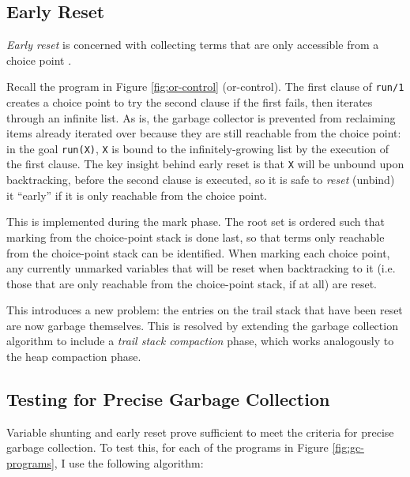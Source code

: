 
\subsection{Early Reset}

\label{sec:early-reset}

\emph{Early reset} is concerned with collecting terms that are only accessible from a choice point \cite{applebyGarbargecollectionProlog1988}.

Recall the program in Figure \ref{fig:or-control} (or-control). The first clause of \texttt{run/1} creates a choice point to try the second clause if the first fails, then iterates through an infinite list. As is, the garbage collector is prevented from reclaiming items already iterated over because they are still reachable from the choice point: in the goal \texttt{run(X)}, \texttt{X} is bound to the infinitely-growing list by the execution of the first clause. The key insight behind early reset is that \texttt{X} will be unbound upon backtracking, before the second clause is executed, so it is safe to \emph{reset} (unbind) it ``early'' if it is only reachable from the choice point.

This is implemented during the mark phase. The root set is ordered such that marking from the choice-point stack is done last, so that terms only reachable from the choice-point stack can be identified. When marking each choice point, any currently unmarked variables that will be reset when backtracking to it (i.e. those that are only reachable from the choice-point stack, if at all) are reset.

This introduces a new problem: the entries on the trail stack that have been reset are now garbage themselves. This is resolved by extending the garbage collection algorithm to include a \emph{trail stack compaction} phase, which works analogously to the heap compaction phase.

\subsection{Testing for Precise Garbage Collection}

\label{sec:gc-testing}

Variable shunting and early reset prove sufficient to meet the criteria for precise garbage collection. To test this, for each of the programs in Figure \ref{fig:gc-programs}, I use the following algorithm:

